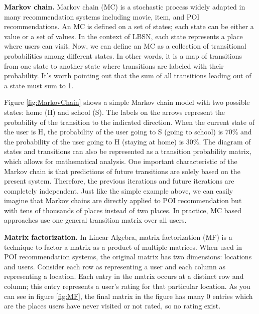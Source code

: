 \documentclass{sig-alternate}
\begin{document}
\textbf{Markov chain.} Markov chain (MC) is a stochastic process widely adapted in many recommendation systems 
including movie, item, and POI recommendations. An MC is defined on a set of states; each state can be either a value
or a set of values. In the context of LBSN, each state represents a place where users can visit.
Now, we can define an MC as a collection of transitional probabilities among different states.
In other words, it is a map of transitions from one state to another state where transitions are labeled with their probability.  
It's worth pointing out that the sum of all transitions leading out of a state must sum to 1.

Figure \ref{fig:MarkovChain} shows a simple Markov chain 
model with two possible states: home (H) and school (S). The labels on the arrows represent 
the probability of the transition to the indicated direction. When the current state of the 
user is H, the probability of the user going to S (going to school) is 70\% and the probability of the 
user going to H (staying at home) is 30\%. The diagram of states and transitions can also be 
represented as a transition probability matrix, which allows for mathematical analysis. One important 
characteristic of the Markov chain is that predictions of future transitions are solely based on the present 
system. Therefore, the previous iterations and future iterations are completely independent. 
Just like the simple example above, we can easily imagine that Markov chains are directly applied to 
POI recommendation but with tens of thousands of places instead of two places. In practice, MC based 
approaches use one general transition matrix over all users. 

\textbf{Matrix factorization.} In Linear Algebra, matrix factorization (MF) is a technique to 
factor a matrix as a product of multiple matrices. When used in POI recommendation systems, 
the original matrix has two dimensions: locations and users. Consider each row as representing a user and each column 
as representing a location. Each entry in the matrix occurs at a distinct row and column; this entry represents a user's rating 
for that particular location. As you can see in figure \ref{fig:MF}, the final matrix in the figure
has many 0 entries which are the places users have never visited or not rated, so no rating exist. 
\end{document}
